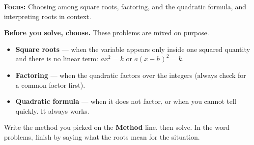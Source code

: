 \documentclass[12pt]{article}
\begin{document}

\noindent\textbf{Focus:} Choosing among square roots, factoring, and the
quadratic formula, and interpreting roots in context.

\vspace{4pt}
\noindent\textbf{Before you solve, choose.} These problems are mixed on purpose.
\begin{itemize}[leftmargin=0.7cm, itemsep=1pt, topsep=2pt]
  \item \textbf{Square roots} --- when the variable appears only inside one
        squared quantity and there is no linear term: $ax^2 = k$ or $a(x-h)^2 = k$.
  \item \textbf{Factoring} --- when the quadratic factors over the integers
        (always check for a common factor first).
  \item \textbf{Quadratic formula} --- when it does not factor, or when you
        cannot tell quickly. It always works.
\end{itemize}
Write the method you picked on the \textbf{Method} line, then solve. In the word
problems, finish by saying what the roots mean for the situation.

\vspace{0.2cm}





\end{document}
